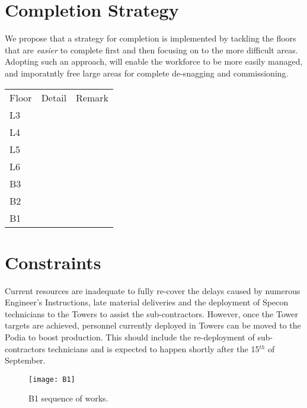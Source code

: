 \section{Completion Strategy}

We propose that a strategy for completion is implemented by tackling the floors that are \textit{easier} to complete first and then focusing on to the more difficult areas. Adopting such an approach, will enable the workforce to be more easily managed, and imporatntly free large areas for complete de-snagging and commissioning.



\begin{tabular}{lll}
Floor   &Detail  &Remark\\
L3      &        &  \\
L4      &        &  \\
L5      &        &  \\
L6      &        &  \\
B3      &        &  \\
B2      &        &  \\
B1      &        &  \\
\end{tabular}





\section{Constraints}
\label{sec:podium}
Current resources are inadequate to fully re-cover the delays caused by numerous Engineer's Instructions, late material deliveries and the deployment of Specon technicians to the Towers to assist the sub-contractors. However, once the Tower targets are achieved, personnel currently deployed in Towers can be moved to the Podia to boost production. This should include the re-deployment of sub-contractors technicians and is expected to happen shortly after the 15$^{th}$ of September.






\begin{figure*}[htbp]
 \texttt{[image: B1]}
  \caption{B1 sequence of works.}
  \label{fig:B1sequence}
\end{figure*}


